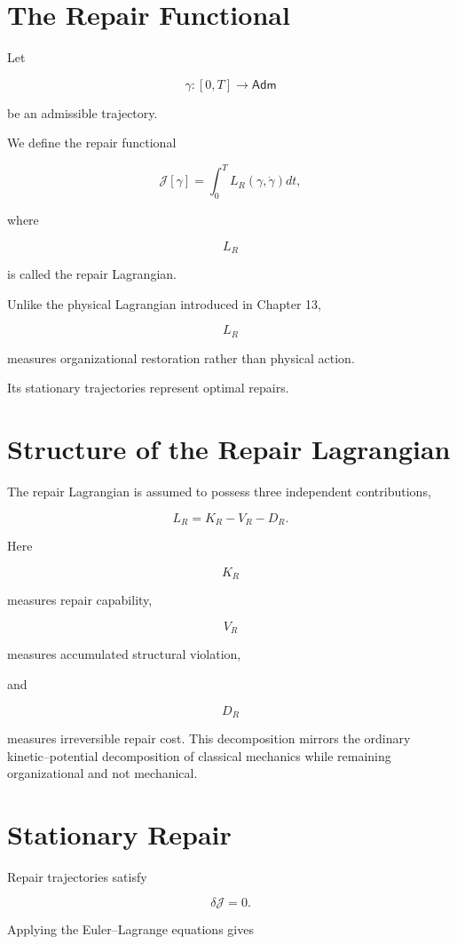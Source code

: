 \documentclass[11pt,oneside]{book}
\numberwithin{equation}{chapter}
\theoremstyle{definition}
\theoremstyle{plain}
\newcommand{\Adm}{\mathsf{Adm}}
\begin{document}
\section{The Repair Functional}

Let

\[
\gamma :
[0,T]
\rightarrow
\Adm
\]

be an admissible trajectory.

We define the repair functional

\[
\mathcal J[\gamma]
=
\int_0^T
L_R
(\gamma,\dot\gamma)
dt,
\]

where

\[
L_R
\]

is called the repair Lagrangian.

Unlike the physical Lagrangian introduced in Chapter 13,

\[
L_R
\]

measures organizational restoration rather than physical action.

Its stationary trajectories represent optimal repairs.

\section{Structure of the Repair Lagrangian}

The repair Lagrangian is assumed to possess three independent
contributions,

\[
L_R
=
K_R
-
V_R
-
D_R.
\]

Here

\[
K_R
\]

measures repair capability,

\[
V_R
\]

measures accumulated structural violation,

and

\[
D_R
\]

measures irreversible repair cost. This decomposition mirrors the ordinary kinetic--potential decomposition of classical mechanics while remaining organizational and not mechanical.

\section{Stationary Repair}

Repair trajectories satisfy

\[
\delta
\mathcal J
=
0.
\]

Applying the Euler--Lagrange equations gives
\end{document}
